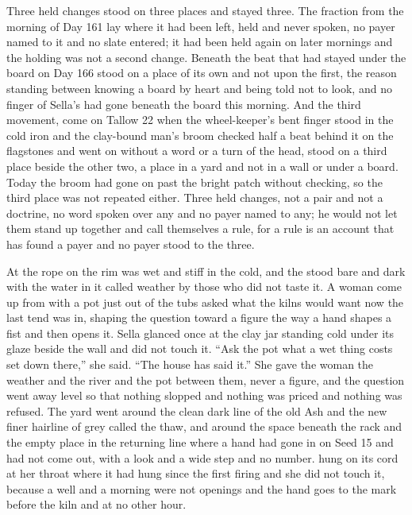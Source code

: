 Three held changes stood on three places and stayed three. The fraction from the morning of Day 161 lay where it had been left, held and never spoken, no payer named to it and no slate entered; it had been held again on later mornings and the holding was not a second change. Beneath  the beat that had stayed under the board on Day 166 stood on a place of its own and not upon the first, the reason standing between knowing a board by heart and being told not to look, and no finger of Sella's had gone beneath the board this morning. And the third movement, come on Tallow 22 when the wheel-keeper's bent finger stood in the cold iron and the clay-bound man's broom checked half a beat behind it on the flagstones and went on without a word or a turn of the head, stood on a third place beside the other two, a place in a yard and not in a wall or under a board. Today the broom had gone on past the bright patch without checking, so the third place was not repeated either. Three held changes, not a pair and not a doctrine, no word spoken over any and no payer named to any; he would not let them stand up together and call themselves a rule, for a rule is an account that has found a payer and no payer stood to the three.

\scenebreak

At  the rope on the rim was wet and stiff in the cold, and the  stood bare and dark with the water in it called weather by those who did not taste it. A woman come up from  with a pot just out of the tubs asked what the kilns would want now the last tend was in, shaping the question toward a figure the way a hand shapes a fist and then opens it. Sella glanced once at the clay jar standing cold under its glaze beside the wall and did not touch it. “Ask the pot what a wet thing costs set down there,” she said. “The house has said it.” She gave the woman the weather and the river and the pot between them, never a figure, and the question went away level so that nothing slopped and nothing was priced and nothing was refused. The yard went around the clean dark line of the old Ash and the new finer hairline of grey called the thaw, and around the space beneath the rack and the empty place in the returning line where a hand had gone in on Seed 15 and had not come out, with a look and a wide step and no number.  hung on its cord at her throat where it had hung since the first firing and she did not touch it, because a well and a morning were not openings and the hand goes to the mark before the kiln and at no other hour.

